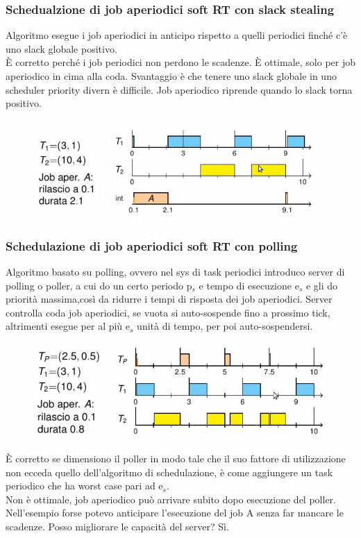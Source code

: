 \documentclass[12pt, oneside]{extbook}
\begin{document}
\subsubsection{Schedualzione di job aperiodici soft RT con slack stealing}
Algoritmo esegue i job aperiodici in anticipo rispetto a quelli periodici finché c'è uno slack globale positivo.\\ È corretto perché i job periodici non perdono le scadenze. È ottimale, solo per job aperiodico in cima alla coda. Svantaggio è che tenere uno slack globale in uno scheduler priority divern è difficile.
Job aperiodico riprende quando lo slack torna positivo.\\
\begin{figure}[!h]
\centering
\includegraphics[scale=0.4]{immagini/image-011.jpg}
\end{figure}
\subsubsection{Schedulazione di job aperiodici soft RT con polling}
Algoritmo basato su polling, ovvero nel sys di task periodici introduco server di polling o poller, a cui do un certo periodo p$_{s}$ e tempo di esecuzione e$_{s}$ e gli do priorità massima,così da ridurre i tempi di risposta dei job aperiodici. Server controlla coda job aperiodici, se vuota si auto-sospende fino a prossimo tick, altrimenti esegue per al più
e$_{s}$ unità di tempo, per poi auto-sospendersi.\\ 
\begin{figure}[!h]
\centering
\includegraphics[scale=0.4]{immagini/image-012.jpg}
\end{figure}
È corretto se dimensiono il poller in modo tale che il suo fattore di utilizzazione non ecceda quello dell'algoritmo di schedulazione, è come aggiungere un task periodico che ha worst case pari ad e$_{s}$. \\ Non è ottimale, job aperiodico può arrivare subito dopo esecuzione del poller. Nell'esempio forse potevo anticipare l'esecuzione del job A senza far mancare le scadenze. Posso migliorare le capacità del server? Sì.
\end{document}
